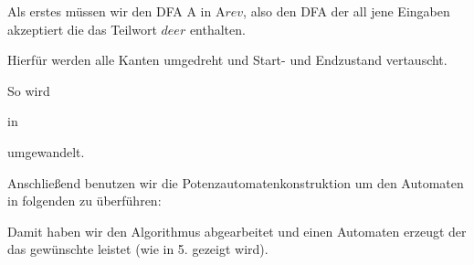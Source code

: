 \usetikzlibrary{automata,arrows}


Als erstes müssen wir den DFA A in A$rev$, also den DFA der all jene Eingaben akzeptiert die das Teilwort $deer$ enthalten.

Hierfür werden alle Kanten umgedreht und Start- und Endzustand vertauscht.

So wird



in 



umgewandelt.

Anschließend benutzen wir die Potenzautomatenkonstruktion um den Automaten in folgenden zu überführen:



Damit haben wir den Algorithmus abgearbeitet und einen Automaten erzeugt der das gewünschte leistet (wie in 5. gezeigt wird).